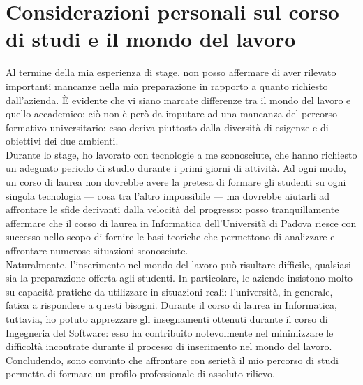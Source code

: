 	\section{Considerazioni personali sul corso di studi e il mondo del lavoro}
		Al termine della mia esperienza di stage, non posso affermare di aver rilevato importanti mancanze nella mia preparazione in
		rapporto a quanto richiesto dall'azienda. È evidente che vi siano marcate differenze tra il mondo del lavoro e quello accademico;
		ciò non è però da imputare ad una mancanza del percorso formativo universitario: esso deriva piuttosto dalla diversità di esigenze e
		di obiettivi dei due ambienti.\\
		Durante lo stage, ho lavorato con tecnologie a me sconosciute, che hanno richiesto un adeguato periodo di studio durante i primi
		giorni di attività. Ad ogni modo, un corso di laurea non dovrebbe avere la pretesa di formare gli studenti su ogni singola tecnologia
		— cosa tra l'altro impossibile — ma dovrebbe aiutarli ad affrontare le sfide derivanti dalla velocità del progresso: posso
		tranquillamente affermare che il corso di laurea in Informatica dell'Università di Padova riesce con successo nello scopo di
		fornire le basi teoriche che permettono di analizzare e affrontare numerose situazioni sconosciute.\\
		Naturalmente, l'inserimento nel mondo del lavoro può risultare difficile, qualsiasi sia la preparazione offerta agli studenti. In
		particolare, le aziende insistono molto su capacità pratiche da utilizzare in situazioni reali: l'università, in generale, fatica a
		rispondere a questi bisogni. Durante il corso di laurea in Informatica, tuttavia, ho potuto apprezzare gli insegnamenti ottenuti
		durante il corso di Ingegneria del Software: esso ha contribuito notevolmente nel minimizzare le difficoltà incontrate durante il
		processo di inserimento nel mondo del lavoro.\\
		Concludendo, sono convinto che affrontare con serietà il mio percorso di studi permetta di formare un profilo professionale di
		assoluto rilievo.
